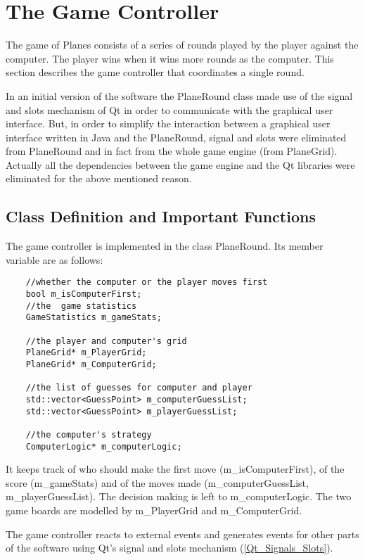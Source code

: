 \section{The Game Controller}

The game of Planes consists of a series of rounds played by the player against the computer. The player wins when it wins more rounds as the computer. This section describes the game controller that coordinates a single round. 

In an initial version of the software the PlaneRound class made use of the signal and slots mechanism of Qt in order to communicate with the graphical user interface. But, in order to simplify the interaction between a graphical user interface written in Java and the PlaneRound, signal and slots were eliminated from PlaneRound and in fact from the whole game engine (from PlaneGrid). Actually all the dependencies between the game engine and the Qt libraries were eliminated for the above mentioned reason.

\subsection {Class Definition and Important Functions}

The game controller is implemented in the class PlaneRound. Its member variable are as follows:

\begin{lstlisting}
	//whether the computer or the player moves first
	bool m_isComputerFirst;
	//the  game statistics
	GameStatistics m_gameStats;
	
	//the player and computer's grid
	PlaneGrid* m_PlayerGrid;
	PlaneGrid* m_ComputerGrid;
	
	//the list of guesses for computer and player
	std::vector<GuessPoint> m_computerGuessList;
	std::vector<GuessPoint> m_playerGuessList;
	
	//the computer's strategy
	ComputerLogic* m_computerLogic;
\end{lstlisting}

It keeps track of who should make the first move (m\_isComputerFirst), of the score (m\_gameStats) and of the moves made (m\_computerGuessList, m\_playerGuessList). The decision making is left to m\_computerLogic. The two game boards are modelled by m\_PlayerGrid and m\_ComputerGrid.

The game controller reacts to external events and generates events for other parts of the software using Qt's signal and slots mechanism (\ref{Qt_Signals_Slots}). 

